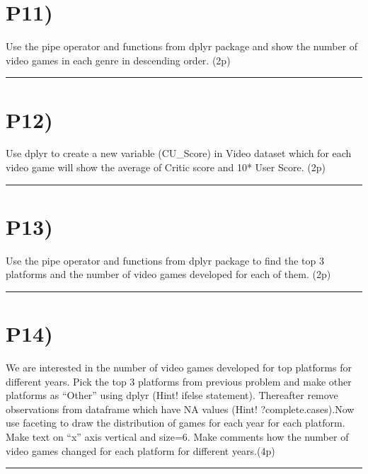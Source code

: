 \documentclass[]{article}
\begin{document}
\section{P11)}\label{p11}

Use the pipe operator and functions from dplyr package and show the
number of video games in each genre in descending order. (2p)

\begin{center}\rule{0.5\linewidth}{\linethickness}\end{center}

\section{P12)}\label{p12}

Use dplyr to create a new variable (CU\_Score) in Video dataset which
for each video game will show the average of Critic score and 10* User
Score. (2p)

\begin{center}\rule{0.5\linewidth}{\linethickness}\end{center}

\section{P13)}\label{p13}

Use the pipe operator and functions from dplyr package to find the top 3
platforms and the number of video games developed for each of them. (2p)

\begin{center}\rule{0.5\linewidth}{\linethickness}\end{center}

\section{P14)}\label{p14}

We are interested in the number of video games developed for top
platforms for different years. Pick the top 3 platforms from previous
problem and make other platforms as ``Other'' using dplyr (Hint! ifelse
statement). Thereafter remove observations from dataframe which have NA
values (Hint! ?complete.cases).Now use faceting to draw the distribution
of games for each year for each platform. Make text on ``x'' axis
vertical and size=6. Make comments how the number of video games changed
for each platform for different years.(4p)

\begin{center}\rule{0.5\linewidth}{\linethickness}\end{center}
\end{document}
